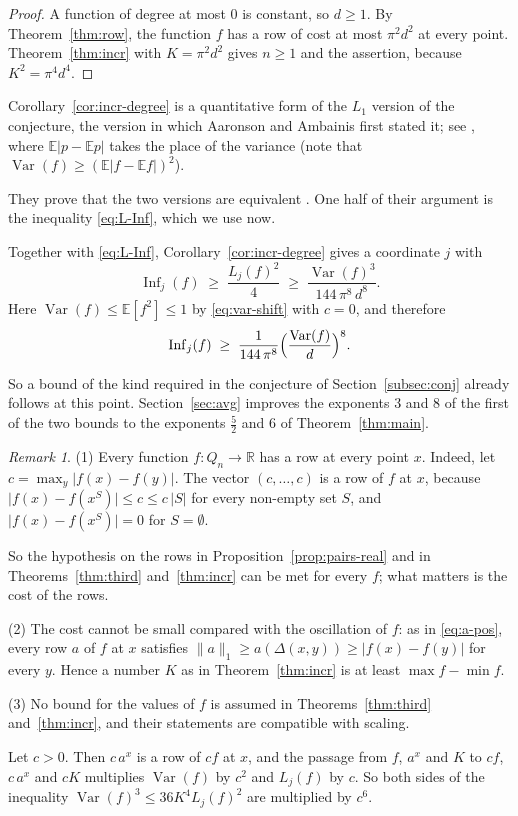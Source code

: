 \documentclass[11pt,reqno]{amsart}
\theoremstyle{definition}
\theoremstyle{remark}
\newtheorem{remark}[theorem]{Remark}
\numberwithin{equation}{section}
\theoremstyle{named}
\theoremstyle{plain}
\newcommand{\R}{\mathbb{R}}
\newcommand{\E}{\mathbb{E}}
\newcommand{\Var}{\operatorname{Var}}
\newcommand{\Inf}{\operatorname{Inf}}
\newcommand{\norm}[1]{\lVert #1\rVert_1}
\newcommand{\abs}[1]{\lvert #1\rvert}
\begin{document}
\begin{proof}
A function of degree at most $0$ is constant, so $d\ge1$. By Theorem~\ref{thm:row}, the function
$f$ has a row of cost at most $\pi^{2}d^{2}$ at every point. Theorem~\ref{thm:incr} with
$K=\pi^{2}d^{2}$ gives $n\ge1$ and the assertion, because $K^{2}=\pi^{4}d^{4}$.
\end{proof}

Corollary~\ref{cor:incr-degree} is a quantitative form of the $L_1$ version of the conjecture, the
version in which Aaronson and Ambainis first stated it; see \cite[Conjecture~6.1]{AA14}, where
$\E\abs{p-\E p}$ takes the place of the variance (note that
$\Var(f)\ge(\E\abs{f-\E f})^{2}$).

They prove that the two versions are equivalent
\cite[Proposition~6.2]{AA14}. One half of their argument is the inequality \eqref{eq:L-Inf}, which
we use now.

Together with \eqref{eq:L-Inf}, Corollary~\ref{cor:incr-degree} gives a coordinate $j$ with
\[
   \Inf_j(f)\;\ge\;\frac{L_j(f)^{2}}{4}\;\ge\;\frac{\Var(f)^{3}}{144\,\pi^{8}\,d^{8}} .
\]
Here $\Var(f)\le\E[f^{2}]\le1$ by \eqref{eq:var-shift} with $c=0$, and therefore
\[
   \Inf_j(f)\;\ge\;\frac{1}{144\,\pi^{8}}\Bigl(\frac{\Var(f)}{d}\Bigr)^{8}.
\]

So a bound of the kind required in the conjecture of Section~\ref{subsec:conj} already follows
at this point. Section~\ref{sec:avg} improves the exponents $3$ and $8$ of the first of the two
bounds to the exponents $\frac52$ and $6$ of Theorem~\ref{thm:main}.

\begin{remark}\label{rem:rows-real}
(1) Every function $f\colon Q_n\to\R$ has a row at every point $x$. Indeed, let
$c=\max_{y}\abs{f(x)-f(y)}$. The vector $(c,\dots,c)$ is a row of $f$ at $x$, because
$\abs{f(x)-f(x^{S})}\le c\le c\,\abs{S}$ for every non-empty set $S$, and
$\abs{f(x)-f(x^{S})}=0$ for $S=\emptyset$.

So the hypothesis on the rows in
Proposition~\ref{prop:pairs-real} and in Theorems~\ref{thm:third} and~\ref{thm:incr} can be met for
every $f$; what matters is the cost of the rows.

(2) The cost cannot be small compared with the oscillation of $f$: as in \eqref{eq:a-pos}, every row
$a$ of $f$ at $x$ satisfies $\norm{a}\ge a(\Delta(x,y))\ge\abs{f(x)-f(y)}$ for every $y$. Hence a
number $K$ as in Theorem~\ref{thm:incr} is at least $\max f-\min f$.

(3) No bound for the values of $f$ is assumed in Theorems~\ref{thm:third} and~\ref{thm:incr}, and
their statements are compatible with scaling.

Let $c>0$. Then $c\,a^{x}$ is a row of $cf$ at $x$,
and the passage from $f$, $a^{x}$ and $K$ to $cf$, $c\,a^{x}$ and $cK$ multiplies $\Var(f)$ by
$c^{2}$ and $L_j(f)$ by $c$. So both sides of the inequality $\Var(f)^{3}\le36K^{4}L_j(f)^{2}$ are
multiplied by $c^{6}$.
\end{remark}
\end{document}
